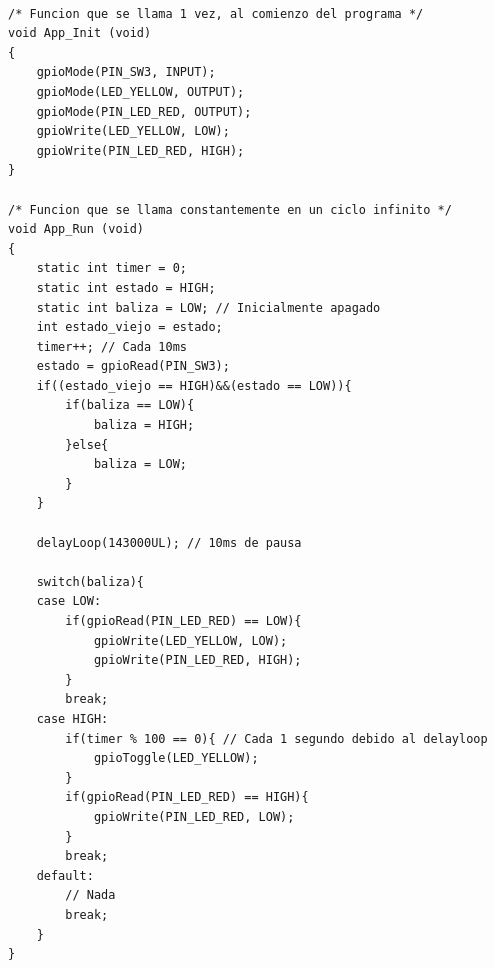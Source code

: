 \documentclass{article}
\begin{document}
\begin{lstlisting}

/* Funcion que se llama 1 vez, al comienzo del programa */
void App_Init (void)
{
	gpioMode(PIN_SW3, INPUT);
    gpioMode(LED_YELLOW, OUTPUT);
    gpioMode(PIN_LED_RED, OUTPUT);
    gpioWrite(LED_YELLOW, LOW);
    gpioWrite(PIN_LED_RED, HIGH);
}

/* Funcion que se llama constantemente en un ciclo infinito */
void App_Run (void)
{
	static int timer = 0;
	static int estado = HIGH;
	static int baliza = LOW; // Inicialmente apagado
	int estado_viejo = estado;
	timer++; // Cada 10ms
	estado = gpioRead(PIN_SW3);
	if((estado_viejo == HIGH)&&(estado == LOW)){
		if(baliza == LOW){
			baliza = HIGH;
		}else{
			baliza = LOW;
		}
	}

	delayLoop(143000UL); // 10ms de pausa

	switch(baliza){
	case LOW:
		if(gpioRead(PIN_LED_RED) == LOW){
		    gpioWrite(LED_YELLOW, LOW);
		    gpioWrite(PIN_LED_RED, HIGH);
		}
		break;
	case HIGH:
		if(timer % 100 == 0){ // Cada 1 segundo debido al delayloop
			gpioToggle(LED_YELLOW);
		}
		if(gpioRead(PIN_LED_RED) == HIGH){
			gpioWrite(PIN_LED_RED, LOW);
		}
		break;
	default:
		// Nada
		break;
	}
}
\end{lstlisting}
\end{document}
